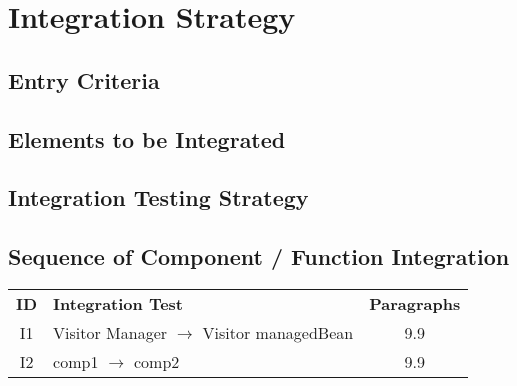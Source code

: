 \chapter{Integration Strategy} \label{chap2}

\section{Entry Criteria}

\section{Elements to be Integrated}

\section{Integration Testing Strategy}

\section{Sequence of Component / Function Integration}

\begin{table}[!htbp]
\begin{center}
\begin{tabular}[t]{cp{}c}

\hline
\textbf{ID} & \textbf{Integration Test} & \textbf{Paragraphs} \\
I1 & Visitor Manager $\rightarrow$ Visitor managedBean & 9.9 \\
\hline
I2 & comp1 $\rightarrow$ comp2 & 9.9 \\
\hline

\end{tabular}
\end{center}
\end{table}
\clearpage